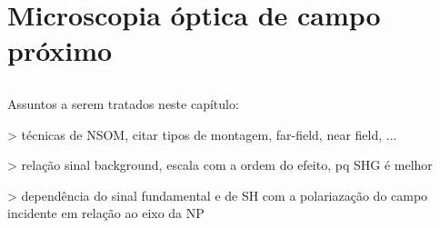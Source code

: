 \chapter{Microscopia óptica de campo próximo}

\section{}

Assuntos a serem tratados neste capítulo:


  >  técnicas de NSOM, citar tipos de montagem, far-field, near field, ... \cite{principle}

  >  relação sinal background, escala com a ordem do efeito, pq SHG é melhor \cite{principle,boyd} 

  > dependência do sinal fundamental e de SH com a polariazação do campo incidente em relação ao eixo da NP \cite{principle,zayats,bouhelier,novotny}
